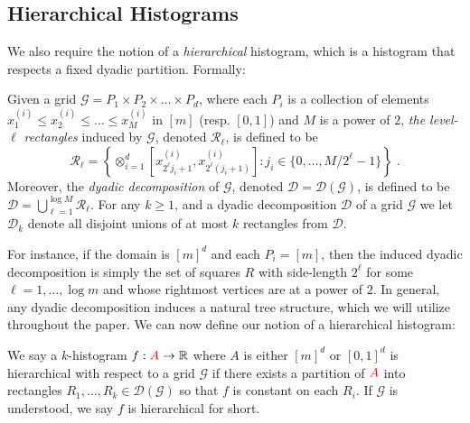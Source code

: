 \documentclass[final,12pt]{colt2018} %
\newcommand{\rect}{\mathcal{R}}
\newcommand{\hier}{\mathcal{D}}
\newcommand{\calG}{\mathcal{G}}
\newcommand{\new}[1]{{\color{red} #1}}
\newcommand{\new}[1]{{#1}}
\begin{document}
\subsection{Hierarchical Histograms}
We also require the notion of a \emph{hierarchical} histogram, which is a histogram that respects a fixed dyadic partition.
Formally:
\begin{definition}
Given a grid $\calG = P_1 \times P_2 \times \ldots \times P_d$, where each $P_i$ is 
a collection of elements $x^{(i)}_1 \leq x^{(i)}_2 \leq \ldots \leq x^{(i)}_M$ in $[m]$ (resp. $[0, 1]$) and $M$ is a power of $2$, 
\emph{the level-$\ell$ rectangles} induced by $\calG$, denoted $\rect_\ell$, is defined to be
\[
\rect_\ell = \left\{ \otimes_{i = 1}^d [x^{(i)}_{2^\ell j_i + 1}, x^{(i)}_{2^{\ell} (j_{i} + 1) }] : j_i \in \{0, \ldots, M / 2^\ell - 1\} \right\} \; .
\]
Moreover, the \emph{dyadic decomposition} of $\calG$, denoted $\hier = \hier (\calG)$, is defined to be $\hier = \bigcup_{\ell = 1}^{\log M} \rect_\ell$.
For any $k \geq 1$, and a dyadic decomposition $\hier$ of a grid $\calG$ we let $\hier_k$ denote all disjoint unions of at most $k$ rectangles from $\hier$.
\end{definition}

For instance, if the domain is $[m]^d$ and each $P_i = [m]$, then the induced dyadic decomposition is 
simply the set of squares $R$ with side-length $2^\ell$ for some $\ell = 1, \ldots, \log m$ 
and whose rightmost vertices are at a power of $2$.
In general, any dyadic decomposition induces a natural tree structure, which we will utilize throughout the paper.
We can now define our notion of a hierarchical histogram:

\begin{definition}
We say a $k$-histogram $f: \new{A} \to \R$ \new{where $A$ is either $[m]^d$ or $[0, 1]^d$} is hierarchical with respect to a grid $\calG$ 
if there exists a partition of $\new{A}$ into rectangles $R_1, \ldots, R_k \in \hier(\calG)$ 
so that $f$ is constant on each $R_i$. If $\calG$ is understood, we say $f$ is hierarchical for short.
\end{definition}
\end{document}
